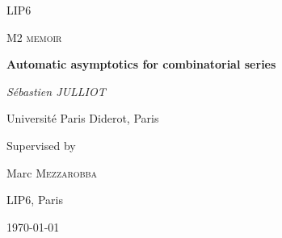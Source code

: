 \documentclass[../main_en.tex]{subfiles}
\begin{document}
\begin{titlepage}
	\centering
	{\scshape\LARGE LIP6 \par}
	\vspace{1cm}
	{\scshape\Large M2 memoir\par}
	\vspace{1.5cm}
	{\huge\bfseries Automatic asymptotics for combinatorial series\par}
	\vspace{2cm}
	{\Large\itshape Sébastien JULLIOT\par}
	Université Paris Diderot, Paris\par
	\vspace{2cm}
	
	Supervised by\par
	{\Large Marc \textsc{Mezzarobba}}\par
	LIP6, Paris
	
	\vfill
	
	{\large \monthyeardate\today\par}
\end{titlepage}
\end{document}
